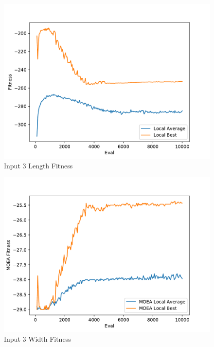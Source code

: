 \documentclass{standalone}
\begin{document}
\begin{figure}[!htb]
	\caption{Input 3 Length Fitness}
	\label{fig:graph_3001}
	\includegraphics[width=\textwidth]{../graphs/graphs/3001.pdf}
\end{figure}


\begin{figure}[!htb]
	\caption{Input 3 Width Fitness}
	\label{fig:graph_3001_moea}
	\includegraphics[width=\textwidth]{../graphs/graphs/3001_moea.pdf}
\end{figure}
\end{document}
